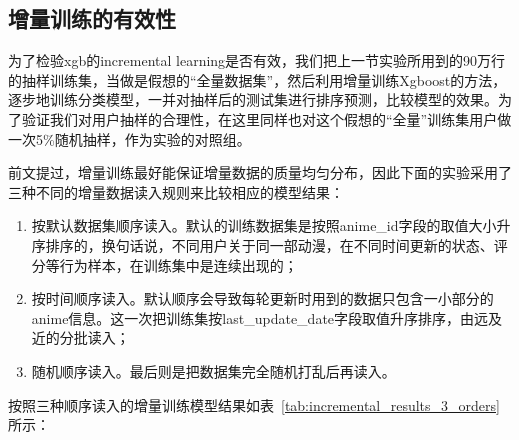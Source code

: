 \subsection{增量训练的有效性}
为了检验xgb的incremental learning是否有效，我们把上一节实验所用到的90万行的抽样训练集，当做是假想的“全量数据集”，然后利用增量训练Xgboost的方法，逐步地训练分类模型，一并对抽样后的测试集进行排序预测，比较模型的效果。为了验证我们对用户抽样的合理性，在这里同样也对这个假想的“全量”训练集用户做一次5\%随机抽样，作为实验的对照组。

前文提过，增量训练最好能保证增量数据的质量均匀分布，因此下面的实验采用了三种不同的增量数据读入规则来比较相应的模型结果：
\begin{enumerate}
	\item 按默认数据集顺序读入。默认的训练数据集是按照anime\_id字段的取值大小升序排序的，换句话说，不同用户关于同一部动漫，在不同时间更新的状态、评分等行为样本，在训练集中是连续出现的；
	\item 按时间顺序读入。默认顺序会导致每轮更新时用到的数据只包含一小部分的anime信息。这一次把训练集按last\_update\_date字段取值升序排序，由远及近的分批读入；
	\item 随机顺序读入。最后则是把数据集完全随机打乱后再读入。
\end{enumerate}
按照三种顺序读入的增量训练模型结果如表~\ref{tab:incremental_results_3_orders}所示：
\begin{table}[htbp]
	\centering
	\caption{不同读入数据顺序下增量训练的结果}
	\label{tab:incremental_results_3_orders}%
\end{table}%

